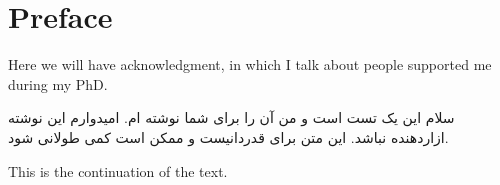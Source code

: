 \chapter*{Preface}                                  \label{ch:preface}

Here we will have acknowledgment, in which I talk about people supported me during my PhD.

\begin{flushright}
\foreignlanguage{persian}
{
 سلام این یک تست است و من آن را برای شما نوشته ام. امیدوارم این نوشته ازاردهنده نباشد. این متن برای قدردانیست و ممکن است کمی طولانی شود.
}
\end{flushright}

This is the continuation of the text.


\cleardoublepage

